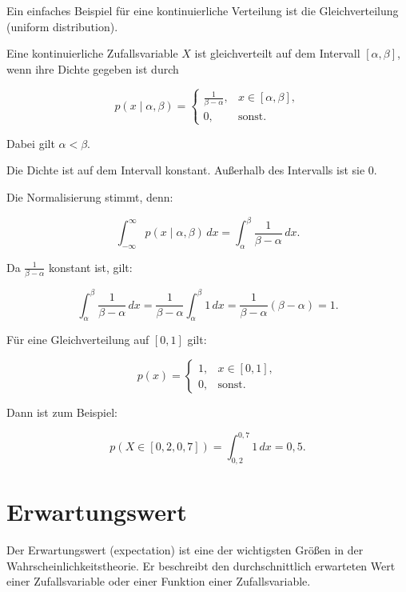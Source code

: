 Ein einfaches Beispiel für eine kontinuierliche Verteilung ist die Gleichverteilung (uniform distribution).

\begin{definitionbox}
Eine kontinuierliche Zufallsvariable \(X\) ist gleichverteilt auf dem Intervall \([\alpha,\beta]\), wenn ihre Dichte gegeben ist durch

\[
    p(x \mid \alpha,\beta)
    =
    \begin{cases}
        \frac{1}{\beta-\alpha}, & x \in [\alpha,\beta], \\
        0, & \text{sonst}.
    \end{cases}
\]

Dabei gilt \(\alpha < \beta\).
\end{definitionbox}

Die Dichte ist auf dem Intervall konstant.
Außerhalb des Intervalls ist sie \(0\).

Die Normalisierung stimmt, denn:

\[
    \int_{-\infty}^{\infty} p(x \mid \alpha,\beta)\,dx
    =
    \int_{\alpha}^{\beta}
    \frac{1}{\beta-\alpha}\,dx.
\]

Da \(\frac{1}{\beta-\alpha}\) konstant ist, gilt:

\[
    \int_{\alpha}^{\beta}
    \frac{1}{\beta-\alpha}\,dx
    =
    \frac{1}{\beta-\alpha}
    \int_{\alpha}^{\beta} 1\,dx
    =
    \frac{1}{\beta-\alpha}
    (\beta-\alpha)
    =
    1.
\]

\begin{examplebox}
Für eine Gleichverteilung auf \([0,1]\) gilt:

\[
    p(x)
    =
    \begin{cases}
        1, & x \in [0,1], \\
        0, & \text{sonst}.
    \end{cases}
\]

Dann ist zum Beispiel:

\[
    p(X \in [0{,}2,0{,}7])
    =
    \int_{0{,}2}^{0{,}7} 1\,dx
    =
    0{,}5.
\]
\end{examplebox}

\section{Erwartungswert}

Der Erwartungswert (expectation) ist eine der wichtigsten Größen in der Wahrscheinlichkeitstheorie.
Er beschreibt den durchschnittlich erwarteten Wert einer Zufallsvariable oder einer Funktion einer Zufallsvariable.

